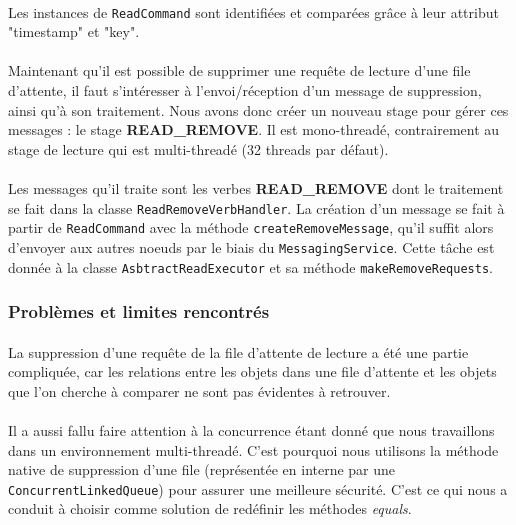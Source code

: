 \documentclass[12pt]{article}
\newcommand{\class}[1]{\texttt{#1}}
\begin{document}
\paragraph{}Les instances de \class{ReadCommand} sont identifiées et comparées grâce à leur attribut "timestamp" et "key".

\paragraph{}Maintenant qu'il est possible de supprimer une requête de lecture d'une file d'attente, il faut s'intéresser à l'envoi/réception d'un message de suppression, ainsi qu'à son traitement. Nous avons donc créer un nouveau stage pour gérer ces messages : le stage \textbf{READ\_REMOVE}. Il est mono-threadé, contrairement au stage de lecture qui est multi-threadé (32 threads par défaut).

\paragraph{}Les messages qu'il traite sont les verbes \textbf{READ\_REMOVE} dont le traitement se fait dans la classe \class{ReadRemoveVerbHandler}. La création d'un message se fait à partir de \class{ReadCommand} avec la méthode \texttt{createRemoveMessage}, qu'il suffit alors d'envoyer aux autres noeuds par le biais du \class{MessagingService}. Cette tâche est donnée à la classe \class{AsbtractReadExecutor} et sa méthode \texttt{makeRemoveRequests}.

\subsubsection*{Problèmes et limites rencontrés}

\paragraph{}La suppression d'une requête de la file d'attente de lecture a été une partie compliquée, car les relations entre les objets dans une file d'attente et les objets que l'on cherche à comparer ne sont pas évidentes à retrouver.

\paragraph{}Il a aussi fallu faire attention à la concurrence étant donné que nous travaillons dans un environnement multi-threadé. C'est pourquoi nous utilisons la méthode native de suppression d'une file (représentée en interne par une \class{ConcurrentLinkedQueue}) pour assurer une meilleure sécurité. C'est ce qui nous a conduit à choisir comme solution de redéfinir les méthodes \textit{equals}.
\end{document}
